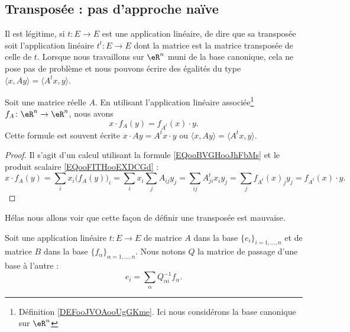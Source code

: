 \subsection{Transposée : pas d'approche naïve}
\label{SUBSECooGPXVooEYwIiJ}

Il est légitime, si \( t\colon E\to E\) est une application linéaire, de dire que sa transposée soit l'application linéaire \( t^t\colon E\to E\) dont la matrice est la matrice transposée de celle de \( t\). Lorsque nous travaillons sur \( \eR^n\) muni de la base canonique, cela ne pose pas de problème et nous pouvons écrire des égalités du type \( \langle x, Ay\rangle =\langle A^tx, y\rangle \).

\begin{proposition}     \label{PROPooNARVooEuhweD}
	Soit une matrice réelle \( A\). En utilisant l'application linéaire associée\footnote{Définition \ref{DEFooJVOAooUgGKme}. Ici nous considérons la base canonique sur \( \eR^n\)} \( f_A\colon \eR^n\to \eR^n\), nous avons
	\begin{equation}
		x\cdot f_A(y)=f_{A^t}(x)\cdot y.
	\end{equation}
	Cette formule est souvent écrite \( x\cdot Ay=A^tx\cdot y\) ou \( \langle x, Ay\rangle =\langle A^tx, y\rangle \).
\end{proposition}

\begin{proof}
	Il s'agit d'un calcul utilisant la formule \eqref{EQooBVGHooJhFbMs} et le produit scalaire \eqref{EQooFITHooEXDCGd} :
	\begin{equation}
		x\cdot f_A(y)=\sum_ix_i\big( f_A(y) \big)_i=\sum_ix_i\sum_jA_{ij}y_j=\sum_{ij}A^t_{ji}x_iy_j=\sum_jf_{A^t}(x)_jy_j=f_{A^t}(x)\cdot y.
	\end{equation}
\end{proof}

Hélas nous allons voir que cette façon de définir une transposée est mauvaise.

Soit une application linéaire \( t\colon E\to E\) de matrice \( A\) dans la base \( \{ e_i \}_{i=1,\ldots, n}\) et de matrice \( B\) dans la base \( \{ f_{\alpha} \}_{\alpha=1,\ldots, n}\). Nous notons \( Q\) la matrice de passage d'une base à l'autre :
\begin{equation}
	e_i=\sum_{\alpha}Q_{\alpha i}^{-1}f_{\alpha}.
\end{equation}


